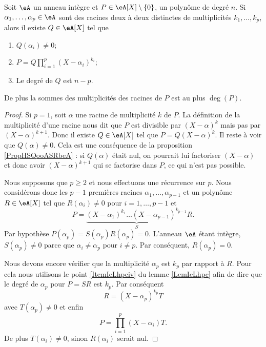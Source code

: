 \begin{theorem} \label{ThoSVZooMpNANi}
    Soit \( \eA\) un anneau intègre et \( P\in \eA[X]\setminus\{ 0 \}\), un polynôme de degré \( n\). Si \( \alpha_1,\ldots, \alpha_p\in\eA\) sont des racines deux à deux distinctes de multiplicités \( k_1,\ldots, k_p\), alors il existe \( Q\in \eA[X]\) tel que
    \begin{enumerate}
        \item
            \( Q(\alpha_i)\neq 0\);
        \item   \label{ItemJZZVooMogYLq}
            \( P=Q\prod_{i=1}^p(X-\alpha_i)^{k_i}\);
        \item
            Le degré de \( Q\) est \( n-p\).
    \end{enumerate}
    De plus la sommes des multiplicités des racines de \( P\) est au plus \( \deg(P)\).
\end{theorem}

\begin{proof}
    Si \( p=1\), soit \( \alpha\) une racine de multiplicité \( k\) de \( P\). La définition de la multiplicité d'une racine nous dit que \( P\) est divisible par \( (X-\alpha)^k\) mais pas par \( (X-\alpha)^{k+1}\). Donc il existe \( Q\in \eA[X]\) tel que \( P=Q(X-\alpha)^k\). Il reste à voir que \( Q(\alpha)\neq 0\). Cela est une conséquence de la proposition \ref{PropHSQooASRbeA} : si \( Q(\alpha)\) était nul, on pourrait lui factoriser \( (X-\alpha)\) et donc avoir \( (X-\alpha)^{k+1}\) qui se factorise dans \( P\), ce qui n'est pas possible.

    Nous supposons que \( p\geq 2\) et nous effectuons une récurrence sur \( p\). Nous considérons donc les \( p-1\) premières racines \( \alpha_1,\ldots, \alpha_{p-1}\) et un polynôme \( R\in\eA[X]\) tel que \( R(\alpha_i)\neq 0\) pour \( i=1,\ldots, p-1\) et
    \begin{equation}
        P=\underbrace{(X-\alpha_1)^{k_1}\ldots (X-\alpha_{p-1})^{k_{p-1}}}_SR.
    \end{equation}
    Par hypothèse \( P(\alpha_p)=S(\alpha_p)R(\alpha_p)=0\). L'anneau \( \eA\) étant intègre, \( S(\alpha_p)\neq 0\) parce que \( \alpha_i\neq \alpha_p\) pour \( i\neq p\). Par conséquent, \( R(\alpha_p)=0\).
    
    Nous devons encore vérifier que la multiplicité \( \alpha_p\) est \( k_p\) par rapport à \( R\). Pour cela nous utilisons le point \ref{ItemIeLhpciv} du lemme \ref{LemIeLhpc} afin de dire que le degré de \( \alpha_p\) pour \( P=SR\) est \( k_p\). Par conséquent
    \begin{equation}
        R=(X-\alpha_p)^{k_p}T
    \end{equation}
    avec \( T(\alpha_p)\neq 0\) et enfin
    \begin{equation}
        P=\prod_{i=1}^p(X-\alpha_i)T.
    \end{equation}
    De plus \( T(\alpha_i)\neq 0\), sinon \( R(\alpha_i)\) serait nul.
\end{proof}

